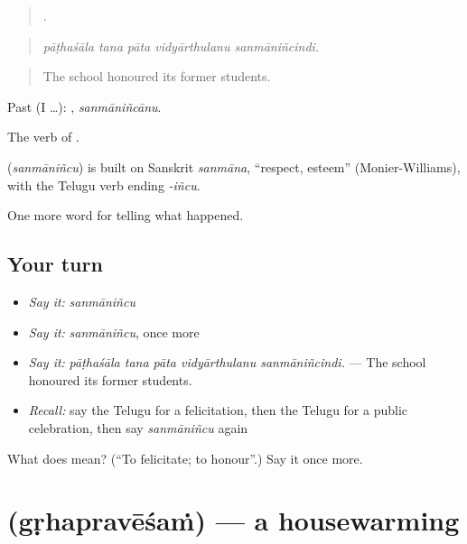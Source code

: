 \begin{quote}
    .
\end{quote}

\begin{quote}
\emph{pāṭhaśāla tana pāta vidyārthulanu sanmāniñcindi.}
\end{quote}

\begin{quote}
The school honoured its former students.
\end{quote}

Past (I …): , \emph{sanmāniñcānu}.

The verb of .

\begin{cousinweb}
\textbf{} (\emph{sanmāniñcu}) is built on Sanskrit \emph{sanmāna}, \textquotedblleft{}respect, esteem\textquotedblright{} (Monier-Williams), with the Telugu verb ending \emph{-iñcu}.
\end{cousinweb}

\begin{grammarlens}[title={What you've built}]
One more word for telling what happened.
\end{grammarlens}

\subsection*{Your turn}
\begin{itemize}
\raggedright
  \item \emph{Say it:} \emph{sanmāniñcu}
  \item \emph{Say it:} \emph{sanmāniñcu}, once more
  \item \emph{Say it:} \emph{pāṭhaśāla tana pāta vidyārthulanu sanmāniñcindi.} — The school honoured its former students.
  \item \emph{Recall:} say the Telugu for a felicitation, then the Telugu for a public celebration, then say \emph{sanmāniñcu} again
\end{itemize}

\begin{tcolorbox}[breakable,colback=teal!4,colframe=teal!35!black,title={Before you move on}]
What does  mean? (\textquotedblleft{}To felicitate; to honour\textquotedblright{}.) Say it once more.
\end{tcolorbox}
\section[\texorpdfstring{\te{గృహప్రవేశం} (gṛhapravēśaṁ)}{గృహప్రవేశం (gṛhapravēśaṁ)}]{ (gṛhapravēśaṁ) — a housewarming}

